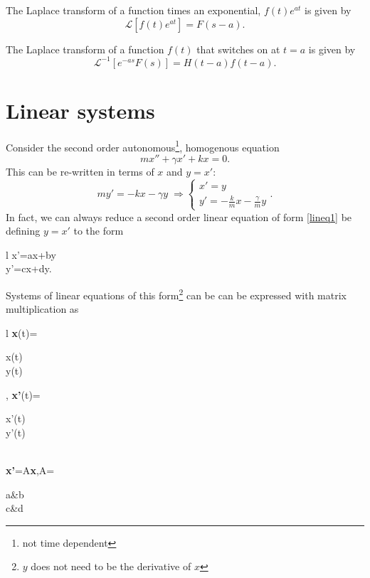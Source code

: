 \documentclass[nobib,notoc]{tufte-handout}
\begin{document}
\begin{defi}
	The Laplace transform of a function times an exponential, \(f(t)e^{at}\) is given by
	\begin{equation*}
		\mathcal{L}[f(t)e^{at}]=F(s-a).
	\end{equation*}
\end{defi}
\begin{defi}
	The Laplace transform of a function \(f(t)\) that switches on at \(t=a\) is given by
	\begin{equation*}
		\mathcal{L}^{-1}[e^{-as}F(s)]=H(t-a)f(t-a).
	\end{equation*}
\end{defi}
\section{Linear systems}
\begin{rema}
	Consider the second order autonomous\footnote{not time dependent}, homogenous equation
	\begin{equation}
		\label{lineq1}
		mx''+\gamma x'+kx=0.
	\end{equation}
	This can be re-written in terms of \(x\) and \(y=x'\):
	\begin{equation*}
		my'=-kx-\gamma y\;\Rightarrow\begin{cases}x'=y\\y'=-\frac{k}{m}x-\frac{\gamma}{m}y\end{cases}.
	\end{equation*}
	In fact, we can always reduce a second order linear equation of form \ref{lineq1} be defining \(y=x'\) to the form
	\begin{IEEEeqnarray*}{l}
		x'=ax+by\\
		y'=cx+dy.
	\end{IEEEeqnarray*}
	Systems of linear equations of this form\footnote{\(y\) does not need to be the derivative of \(x\)} can be  can be expressed with matrix multiplication as
	\begin{IEEEeqnarray*}{l}
		\textbf{x}(t)=
		\begin{pmatrix}
			x(t)\\y(t)
		\end{pmatrix},\quad
		\textbf{x'}(t)=
		\begin{pmatrix}
			x'(t)\\y'(t)
		\end{pmatrix}\\
		\textbf{x'}=A\textbf{x},\quad A=
		\begin{pmatrix}
			a&b\\
			c&d
		\end{pmatrix}
	\end{IEEEeqnarray*}
\end{rema}
\end{document}
